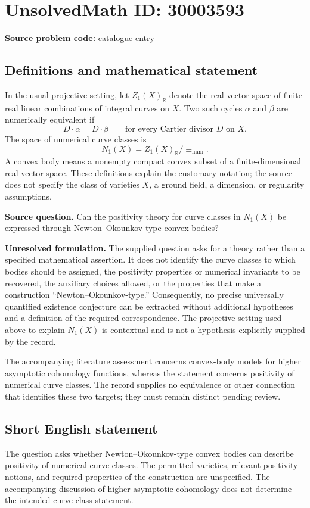 \documentclass[11pt]{article}
\newcommand{\R}{\mathbb{R}}
\begin{document}
\section*{UnsolvedMath ID: 30003593}
\textbf{Source problem code:} catalogue entry
\subsection{Definitions and mathematical statement}
In the usual projective setting, let \(Z_1(X)_{\R}\) denote the real vector space of finite real linear combinations of integral curves on \(X\). Two such cycles \(\alpha\) and \(\beta\) are numerically equivalent if
\[
D\cdot\alpha=D\cdot\beta\qquad\text{for every Cartier divisor }D\text{ on }X.
\]
The space of numerical curve classes is
\[
N_1(X)=Z_1(X)_{\R}/\!\equiv_{\mathrm{num}}.
\]
A convex body means a nonempty compact convex subset of a finite-dimensional real vector space. These definitions explain the customary notation; the source does not specify the class of varieties \(X\), a ground field, a dimension, or regularity assumptions.

\textbf{Source question.} Can the positivity theory for curve classes in \(N_1(X)\) be expressed through Newton--Okounkov-type convex bodies?

\textbf{Unresolved formulation.} The supplied question asks for a theory rather than a specified mathematical assertion. It does not identify the curve classes to which bodies should be assigned, the positivity properties or numerical invariants to be recovered, the auxiliary choices allowed, or the properties that make a construction ``Newton--Okounkov-type.'' Consequently, no precise universally quantified existence conjecture can be extracted without additional hypotheses and a definition of the required correspondence. The projective setting used above to explain \(N_1(X)\) is contextual and is not a hypothesis explicitly supplied by the record.

The accompanying literature assessment concerns convex-body models for higher asymptotic cohomology functions, whereas the statement concerns positivity of numerical curve classes. The record supplies no equivalence or other connection that identifies these two targets; they must remain distinct pending review.
\subsection{Short English statement}
The question asks whether Newton--Okounkov-type convex bodies can describe positivity of numerical curve classes. The permitted varieties, relevant positivity notions, and required properties of the construction are unspecified. The accompanying discussion of higher asymptotic cohomology does not determine the intended curve-class statement.
\end{document}

